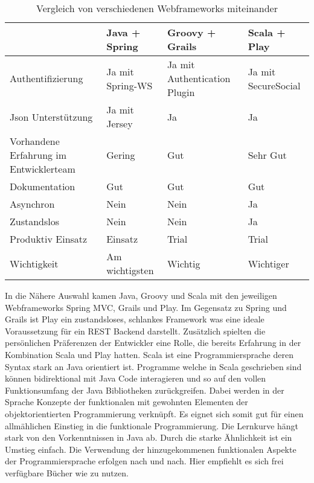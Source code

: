 \begin{table}
  \begin{tabularx}{\textwidth}{|X|l|l|l|}
    \hline
    ~                                      & Java + Spring    & Groovy + Grails              & Scala + Play        \\\hline
    Authentifizierung                      & Ja mit Spring-WS & Ja mit Authentication Plugin & Ja mit SecureSocial \\\hline
    Json Unterstützung                     & Ja mit Jersey    & Ja                           & Ja                  \\\hline
    Vorhandene Erfahrung im Entwicklerteam & Gering           & Gut                          & Sehr Gut            \\\hline
    Dokumentation                          & Gut              & Gut                          & Gut                 \\\hline
    Asynchron                              & Nein             & Nein                         & Ja                  \\\hline
    Zustandslos                            & Nein             & Nein                         & Ja                  \\\hline
    Produktiv Einsatz                      & Einsatz          & Trial                        & Trial               \\\hline
    Wichtigkeit                            & Am wichtigsten   & Wichtig                      & Wichtiger           \\\hline
  \end{tabularx}
  \caption {Vergleich von verschiedenen Webframeworks miteinander}
  \label{tab:FrameWorkVergleich}
\end{table}
In die Nähere Auswahl kamen Java, Groovy und Scala mit den jeweiligen Webframeworks Spring MVC, Grails und Play. Im Gegensatz zu Spring und Grails ist Play ein zustandsloses, schlankes Framework was eine ideale Voraussetzung für ein REST Backend darstellt. Zusätzlich spielten die persönlichen Präferenzen der Entwickler eine Rolle, die bereits Erfahrung in der Kombination Scala und Play hatten.
Scala ist eine Programmiersprache deren Syntax stark an Java orientiert ist. Programme welche in Scala geschrieben sind können bidirektional mit Java Code interagieren und so auf den vollen Funktionsumfang der Java Bibliotheken zurückgreifen. Dabei werden in der Sprache Konzepte der funktionalen mit gewohnten Elementen der objektorientierten Programmierung verknüpft. Es eignet sich somit gut für einen allmählichen Einstieg in die funktionale Programmierung. Die Lernkurve hängt stark von den Vorkenntnissen in Java ab. Durch die starke Ähnlichkeit ist ein Umstieg einfach. Die Verwendung der hinzugekommenen funktionalen Aspekte der Programmiersprache erfolgen nach und nach. Hier empfiehlt es sich frei verfügbare Bücher wie \cite{scala-by-example} zu nutzen.
\FloatBarrier
